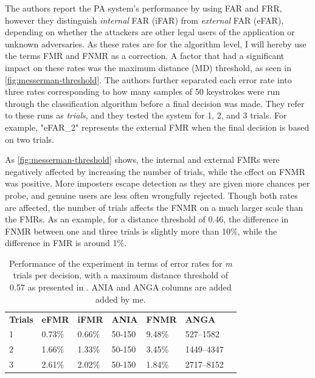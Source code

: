 \documentclass[informationsecurity]{gucmasterproject}
\begin{document}
The authors report the PA system's performance by using FAR and FRR, however they distinguish \textit{internal} FAR (iFAR) from \textit{external} FAR (eFAR), depending on whether the attackers are other legal users of the application or unknown adversaries.
As these rates are for the algorithm level, I will hereby use the terms FMR and FNMR as a correction.
A factor that had a significant impact on these rates was the maximum distance (MD) threshold, as seen in \cref{fig:messerman-threshold}.
The authors further separated each error rate into three rates corresponding to how many samples of 50 keystrokes were run through the classification algorithm before a final decision was made.
They refer to these runs as \textit{trials}, and they tested the system for 1, 2, and 3 trials.
For example, "eFAR\_2" represents the external FMR when the final decision is based on two trials. 

As \cref{fig:messerman-threshold} shows, the internal and external FMRs were negatively affected by increasing the number of trials, while the effect on FNMR was positive.
More imposters escape detection as they are given more chances per probe, and genuine users are less often wrongfully rejected.
Though both rates are affected, the number of trials affects the FNMR on a much larger scale than the FMRs.
As an example, for a distance threshold of 0.46, the difference in FNMR between one and three trials is slightly more than 10\%, while the difference in FMR is around 1\%.


\begin{table}[h]
    \centering
    \begin{tabular}{lllllll}
         \bf Trials & \bf eFMR & \bf iFMR & \bf ANIA & \bf FNMR & \bf ANGA\\
         1 & 0.73\% & 0.66\% & 50-150 & 9.48\% & 527--1582 \\
         2 & 1.66\% & 1.33\% & 50-150 & 3.45\% & 1449--4347\\
         3 & 2.61\% & 2.02\% & 50-150 & 1.84\% & 2717--8152\\
    \end{tabular}
    \caption{Performance of the experiment in terms of error rates for \textit{m} trials per decision, with a maximum distance threshold of 0.57 as presented in \cite{Messerman}. ANIA and ANGA columns are added added by me.}
    \label{tab:messerman-perf}
\end{table}
\end{document}
